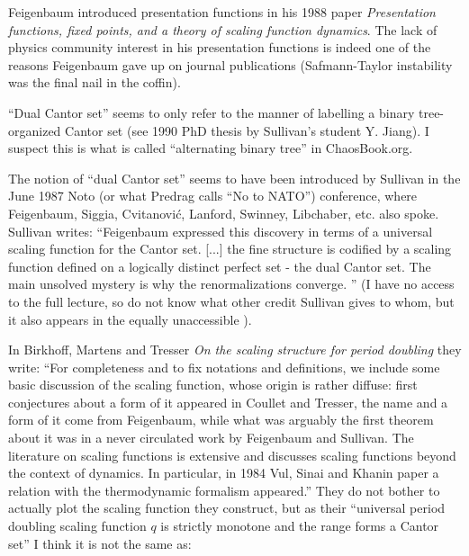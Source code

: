 \begin{description}
Feigenbaum introduced presentation functions in his 1988
paper {\em Presentation functions, fixed points, and a
theory of scaling function dynamics}. The lack of physics community
interest in his presentation functions is indeed one of the reasons
Feigenbaum gave up on journal publications
(Safmann-Taylor instability was the final nail in the
coffin).

``Dual Cantor set'' {seems to only} refer to the manner of labelling a
binary tree-organized Cantor set (see 1990 PhD thesis by Sullivan's
student
{Y. Jiang}). I suspect this is what is called ``alternating  binary
tree'' in
{ChaosBook.org}.

The notion of ``dual Cantor set'' seems to have been introduced by
Sullivan in the June 1987 Noto (or what Predrag calls ``No
to NATO'') conference, where Feigenbaum, Siggia,
Cvitanovi{\'c}, Lanford, Swinney, Libchaber, etc. also spoke. Sullivan
writes: ``Feigenbaum expressed this discovery in terms of a universal
scaling function for the Cantor set. [...] the fine structure is codified
by a scaling function defined on a logically distinct perfect set - the
dual Cantor set. The main unsolved mystery is why the renormalizations
converge. '' (I have no access to the full lecture, so do not know what
other credit Sullivan gives to whom, but it also appears in the equally
unaccessible ).

In Birkhoff, Martens and Tresser
{\em On the scaling structure for period doubling} they write:
``For  completeness  and  to fix notations  and  definitions,  we include
some  basic discussion  of the scaling function,  whose origin is rather
diffuse:  first  conjectures  about a form  of it  appeared  in Coullet
and Tresser, the name and a  form  of it  come from
Feigenbaum, while what  was  arguably the first theorem
about  it was in a never circulated  work by Feigenbaum  and  Sullivan.
The literature  on  scaling functions  is  extensive  and  discusses
scaling functions  beyond  the context  of dynamics.  In  particular,  in
1984 Vul, Sinai and Khanin paper  a  relation  with  the
thermodynamic  formalism  appeared.''
They do not bother to actually plot the scaling function they construct,
but as their ``universal period doubling scaling function $q$ is strictly
monotone and the range forms a Cantor set'' I think it is not the same
as:


\end{description}
